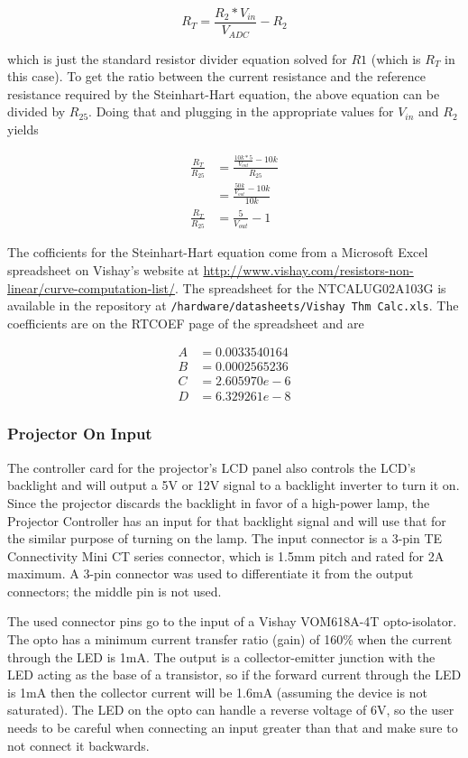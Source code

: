 \documentclass{article}
\begin{document}
\[
R_T = \frac{R_2*V_{in}}{V_{ADC}} - R_2
\]

which is just the standard resistor divider equation solved for $R1$ (which is $R_T$ in this case).
To get the ratio between the current resistance and the reference resistance required by the 
Steinhart-Hart equation, the above equation can be divided by $R_{25}$.  Doing that and plugging in
the appropriate values for $V_{in}$ and $R_2$ yields

\begin{align*}
    \frac{R_T}{R_{25}} &= \frac{\frac{10k * 5}{V_{out}} - 10k}{R_{25}} \\
    &= \frac{\frac{50k}{V_{out}} - 10k}{10k} \\
    \frac{R_T}{R_{25}} &= \frac{5}{V_{out}} - 1
\end{align*}

The cofficients for the Steinhart-Hart equation come from a Microsoft Excel spreadsheet on Vishay's
website at \url{http://www.vishay.com/resistors-non-linear/curve-computation-list/}.  The
spreadsheet for the NTCALUG02A103G is available in the repository at
\texttt{/hardware/datasheets/Vishay Thm Calc.xls}.  The coefficients are on the RTCOEF page of the
spreadsheet and are

\begin{align*}
    A &= 0.0033540164 \\
    B &= 0.0002565236 \\
    C &= 2.605970e-6 \\
    D &= 6.329261e-8
\end{align*}

\subsubsection{Projector On Input} \label{sssec:PJOnInput}
The controller card for the projector's LCD panel also controls the LCD's backlight and will output
a 5V or 12V signal to a backlight inverter to turn it on.  Since the projector discards the
backlight in favor of a high-power lamp, the Projector Controller has an input for that backlight
signal and will use that for the similar purpose of turning on the lamp.  The input connector is a
3-pin TE Connectivity Mini CT series connector, which is 1.5mm pitch and rated for 2A maximum.  A
3-pin connector was used to differentiate it from the output connectors; the middle pin is not used.

The used connector pins go to the input of a Vishay VOM618A-4T opto-isolator. The opto has a minimum
current transfer ratio (gain) of 160\% when the current through the LED is 1mA.  The output is a
collector-emitter junction with the LED acting as the base of a transistor, so if the forward
current through the LED is 1mA then the collector current will be 1.6mA (assuming the device is not
saturated).  The LED on the opto can handle a reverse voltage of 6V, so the user needs to be careful
when connecting an input greater than that and make sure to not connect it backwards.
\end{document}
